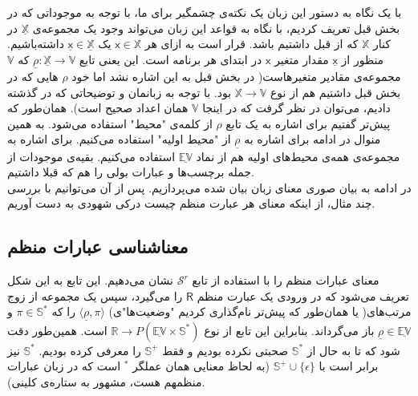 با یک نگاه به دستور این زبان یک نکته‌ی چشمگیر برای ما، با توجه به موجوداتی که در بخش قبل تعریف کردیم، با نگاه به قواعد این زبان می‌تواند وجود یک مجموعه‌ی
$\mathbb{\underline{X}}$
در کنار 
$\mathbb{X}$
که از قبل داشتیم باشد. قرار است به ازای هر 
$\mathsf{x}\in\mathbb{X}$
یک 
$\mathsf{\underline{x}}\in\mathbb{\underline{X}}$
داشته‌باشیم. منظور از 
$\mathsf{\underline{x}}$
مقدار متغیر 
$\mathsf{x}$
در ابتدای هر برنامه است. این یعنی تابع
$\underline{\rho}: \mathbb{\underline{X}} \rightarrow \mathbb{V}$
که 
$\mathbb{V}$
مجموعه‌ی مقادیر متغیرهاست( در بخش قبل به این اشاره نشد اما خود
$\rho$
هایی که در بخش قبل داشتیم هم از نوع
$\mathbb{X} \rightarrow \mathbb{V}$
بود. با توجه به زبانمان و توضیحاتی که در گذشته دادیم، می‌توان در نظر گرفت که در اینجا 
$\mathbb{V}$
همان اعداد صحیح است). همان‌طور که پیش‌تر گفتیم برای اشاره به یک تابع
$\rho$
از کلمه‌ی "محیط" استفاده می‌شود. به همین منوال در ادامه برای اشاره‌ به 
$\underline{\rho}$
از "محیط اولیه" استفاده می‌کنیم. برای اشاره به مجموعه‌ی همه‌ی محیط‌های اولیه هم از نماد 
$\underline{\mathbb{EV}}$
استفاده می‌کنیم.
بقیه‌ی موجودات از جمله برچسب‌ها و عبارات بولی را هم که قبلا داشتیم.\\
در ادامه به بیان صوری معنای زبان بیان شده می‌پردازیم. پس از آن می‌توانیم با بررسی چند مثال، از اینکه معنای هر عبارت منظم چیست درکی شهودی به دست آوریم.\\

\subsection{معناشناسی عبارات منظم}
معنای عبارات منظم را با استفاده از تابع 
$\mathcal{S}^r$
نشان می‌دهیم. این تابع به این شکل تعریف می‌شود که در ورودی یک عبارت منظم 
$\mathsf{R}$
را می‌گیرد، سپس یک مجموعه از زوج مرتب‌های( یا همان‌طور که پیش‌تر نام‌گذاری کردیم "وضعیت‌ها"ی)
$\langle\underline{\rho} , \pi\rangle$
را که 
$\pi \in \mathbb{S^*}$
و 
$\underline{\rho} \in \underline{\mathbb{EV}}$
باز می‌گرداند. بنابراین این تابع از نوع
$\mathbb{R} \rightarrow \mathit{P} (\mathbb{\underline{EV} \times S^*})$
است. همین‌طور دقت شود که تا به حال از 
$\mathbb{S}^*$
صحبتی نکرده بودیم و فقط 
$\mathbb{S}^+$
را معرفی کرده بودیم. 
$\mathbb{S}^*$
نیز برابر است با
$\mathbb{S}^+ \cup \{\epsilon\}$ 
(به لحاظ معنایی همان عملگر
$^*$
است که در زبان عبارات منظمهم هست، مشهور به ستاره‌ی کلینی).

